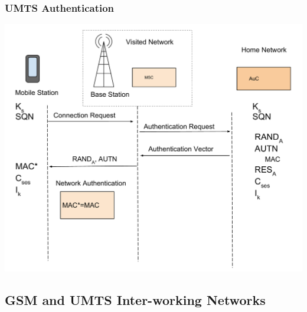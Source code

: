 \documentclass{beamer}
\begin{document}
	\begin{frame}
	\frametitle{UMTS Authentication}
  \begin{center}
  \includegraphics[width=.9\textwidth, height=.85\textheight]{Images/UMTSAuthentication3.pdf}

  \end{center} 
	\end{frame}
\subsection{GSM and UMTS Inter-working Networks}
\end{document}
